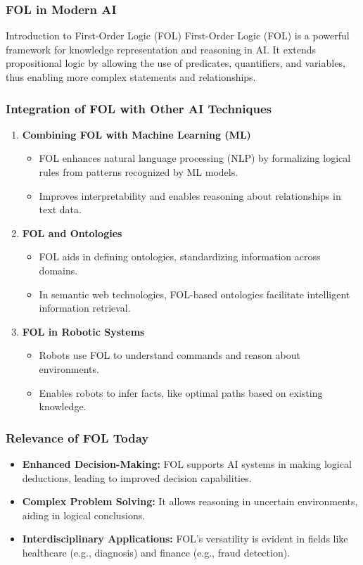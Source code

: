 \documentclass[aspectratio=169]{beamer}
\begin{document}
\begin{frame}[fragile]
  \frametitle{FOL in Modern AI}
  \begin{block}{Introduction to First-Order Logic (FOL)}
    First-Order Logic (FOL) is a powerful framework for knowledge representation and reasoning in AI. 
    It extends propositional logic by allowing the use of predicates, quantifiers, and variables, thus enabling more complex statements and relationships.
  \end{block}
\end{frame}

\begin{frame}[fragile]
  \frametitle{Integration of FOL with Other AI Techniques}
  \begin{enumerate}
    \item \textbf{Combining FOL with Machine Learning (ML)}
      \begin{itemize}
        \item FOL enhances natural language processing (NLP) by formalizing logical rules from patterns recognized by ML models.
        \item Improves interpretability and enables reasoning about relationships in text data.
      \end{itemize}
    
    \item \textbf{FOL and Ontologies}
      \begin{itemize}
        \item FOL aids in defining ontologies, standardizing information across domains.
        \item In semantic web technologies, FOL-based ontologies facilitate intelligent information retrieval.
      \end{itemize}
    
    \item \textbf{FOL in Robotic Systems}
      \begin{itemize}
        \item Robots use FOL to understand commands and reason about environments.
        \item Enables robots to infer facts, like optimal paths based on existing knowledge.
      \end{itemize}
  \end{enumerate}
\end{frame}

\begin{frame}[fragile]
  \frametitle{Relevance of FOL Today}
  \begin{itemize}
    \item \textbf{Enhanced Decision-Making:} 
      FOL supports AI systems in making logical deductions, leading to improved decision capabilities.
    \item \textbf{Complex Problem Solving:} 
      It allows reasoning in uncertain environments, aiding in logical conclusions.
    \item \textbf{Interdisciplinary Applications:} 
      FOL's versatility is evident in fields like healthcare (e.g., diagnosis) and finance (e.g., fraud detection).
  \end{itemize}
\end{frame}
\end{document}
